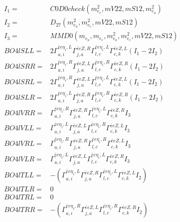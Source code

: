 \documentclass[A4,landscape]{article}
\begin{document}
\begin{align} 
I_1 = & C0D0check(m^2_{e_{{c}}}, mV22, mS12, m^2_{e_{{a}}}) \\ 
I_2 = & D_{27}(m^2_{e_{{a}}}, m^2_{e_{{c}}}, mV22, mS12) \\ 
I_3 = & MMD0(m_{e_{{a}}}, m_{e_{{c}}}, m^2_{e_{{a}}}, m^2_{e_{{c}}}, mV22, mS12) \\ 
  BO4lSLL= & 2  \Gamma^{\bar{e}e \eta_i ,L}_{a, i} \Gamma^{\bar{e}e Z ,R}_{j, a} \Gamma^{\bar{e}e \eta_i ,L}_{l, c} \Gamma^{\bar{e}e Z ,L}_{c, k} (I_1 - 2 I_2) \\ 
  BO4lSRR= & 2  \Gamma^{\bar{e}e \eta_i ,R}_{a, i} \Gamma^{\bar{e}e Z ,L}_{j, a} \Gamma^{\bar{e}e \eta_i ,R}_{l, c} \Gamma^{\bar{e}e Z ,R}_{c, k} (I_1 - 2 I_2) \\ 
  BO4lSRL= & 2  \Gamma^{\bar{e}e \eta_i ,R}_{a, i} \Gamma^{\bar{e}e Z ,L}_{j, a} \Gamma^{\bar{e}e \eta_i ,L}_{l, c} \Gamma^{\bar{e}e Z ,L}_{c, k} (I_1 - 2 I_2) \\ 
  BO4lSLR= & 2  \Gamma^{\bar{e}e \eta_i ,L}_{a, i} \Gamma^{\bar{e}e Z ,R}_{j, a} \Gamma^{\bar{e}e \eta_i ,R}_{l, c} \Gamma^{\bar{e}e Z ,R}_{c, k} (I_1 - 2 I_2) \\ 
  BO4lVRR= &  \Gamma^{\bar{e}e \eta_i ,R}_{a, i} \Gamma^{\bar{e}e Z ,R}_{j, a} \Gamma^{\bar{e}e \eta_i ,L}_{l, c} \Gamma^{\bar{e}e Z ,R}_{c, k} I_3 \\ 
  BO4lVLL= &  \Gamma^{\bar{e}e \eta_i ,L}_{a, i} \Gamma^{\bar{e}e Z ,L}_{j, a} \Gamma^{\bar{e}e \eta_i ,R}_{l, c} \Gamma^{\bar{e}e Z ,L}_{c, k} I_3 \\ 
  BO4lVRL= &  \Gamma^{\bar{e}e \eta_i ,R}_{a, i} \Gamma^{\bar{e}e Z ,R}_{j, a} \Gamma^{\bar{e}e \eta_i ,R}_{l, c} \Gamma^{\bar{e}e Z ,L}_{c, k} I_3 \\ 
  BO4lVLR= &  \Gamma^{\bar{e}e \eta_i ,L}_{a, i} \Gamma^{\bar{e}e Z ,L}_{j, a} \Gamma^{\bar{e}e \eta_i ,L}_{l, c} \Gamma^{\bar{e}e Z ,R}_{c, k} I_3 \\ 
  BO4lTLL= & -( \Gamma^{\bar{e}e \eta_i ,L}_{a, i} \Gamma^{\bar{e}e Z ,R}_{j, a} \Gamma^{\bar{e}e \eta_i ,L}_{l, c} \Gamma^{\bar{e}e Z ,L}_{c, k} I_2) \\ 
  BO4lTLR= & 0 \\ 
  BO4lTRL= & 0 \\ 
  BO4lTRR= & -( \Gamma^{\bar{e}e \eta_i ,R}_{a, i} \Gamma^{\bar{e}e Z ,L}_{j, a} \Gamma^{\bar{e}e \eta_i ,R}_{l, c} \Gamma^{\bar{e}e Z ,R}_{c, k} I_2) \\ 
\end{align} 
\end{document}

